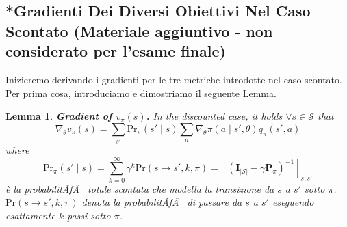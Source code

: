 ﻿\documentclass[11pt, a4paper]{report}
\newtheorem{lemma}{Lemma}
\begin{document}
\subsection{*Gradienti Dei Diversi Obiettivi Nel Caso Scontato {\normalfont\small(Materiale aggiuntivo - non considerato per l'esame finale)}}
Inizieremo derivando i gradienti per le tre metriche introdotte nel caso scontato. Per prima cosa, introduciamo e dimostriamo il seguente Lemma.

\begin{lemma}
\textbf{Gradient of $v_{\pi}(s)$.} In the discounted case, it holds $\forall s \in \mathcal{S}$ that
\begin{equation}
\nabla_{\theta} v_{\pi}(s) = \sum_{s'} \text{Pr}_{\pi}(s' \mid s) \sum_a \nabla_{\theta} \pi(a \mid s', \theta) q_{\pi}(s', a)
\end{equation}
where
\begin{equation}
\text{Pr}_{\pi}(s' \mid s) = \sum_{k=0}^{\infty} \gamma^k \text{Pr}(s \to s', k, \pi) = [(\bm{I}_{|\mathcal{S}|} - \gamma \bm{P}_{\pi})^{-1}]_{s, s'}
\end{equation}
è la probabilitÃƒÂ  totale scontata che modella la transizione da $s$ a $s'$ sotto $\pi$. $\text{Pr}(s \to s', k, \pi)$ denota la probabilitÃƒÂ  di passare da $s$ a $s'$ eseguendo esattamente $k$ passi sotto $\pi$.
\end{lemma}
\end{document}

